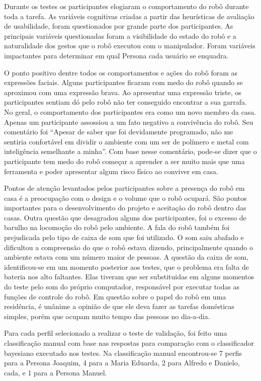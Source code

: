Durante os testes os participantes elogiaram o comportamento do robô durante toda a tarefa. As variáveis cognitivas criadas a partir das heurísticas de avaliação de usabilidade, foram questionados por grande parte dos participantes. As principais variáveis questionadas foram a visibilidade do estado do robô e a naturalidade dos gestos que o robô executou com o manipulador. Foram variáveis impactantes para determinar em qual Persona cada usuário se enquadra.

O ponto positivo dentre todos os comportamentos e ações do robô foram as expressões faciais. Alguns participantes ficaram com medo do robô quando se aproximou com uma expressão brava. Ao apresentar uma expressão triste, os participantes sentiam dó pelo robô não ter conseguido encontrar a sua garrafa. No geral, o comportamento dos participantes era como um novo membro da casa. Apenas um participante assossiou a um fato negativo a convivência do robô. Seu comentário foi ``Apesar de saber que foi devidamente programado, não me sentiria confortável em dividir o ambiente com um ser de polímero e metal com inteligência semelhante a minha''. Com base nesse comentário, pode-se dizer que o participante tem medo do robô começar a aprender a ser muito  mais que uma ferramenta e poder apresentar algum risco físico ao conviver em casa.

Pontos de atenção levantados pelos participantes sobre a presença do robô em casa é a preocupação com o design e o volume que o robô ocupará. São pontos importantes para o desenvolvimento do projeto e aceitação do robô dentro das casas. Outra questão que desagradou alguns dos participantes, foi o excesso de barulho na locomoção do robô pelo ambiente. A fala do robô também foi prejudicada pelo tipo de caixa de som que foi utilizado. O som saiu abafado e dificultou a compreensão do que o robô estava dizendo, principalmente quando o ambiente estava com um número maior de pessoas. A questão da caixa de som, identificou-se em um momento posterior aos testes, que o problema era falta de bateria nos alto faltantes. Elas tiveram que ser substituidas em alguns momentos do teste pelo som do próprio computador, responsável por executar todas as funções de controle do robô. Em questão sobre o papel do robô em uma residência, é unânime a opinião de que ele deva fazer as tarefas domésticas simples, porém que ocupam muito tempo das pessoas no dia-a-dia.

Para cada perfil selecionado a realizar o teste de validação, foi feito uma classificação manual com base nas respostas para comparação com o classificador bayesiano executado nos testes. Na classificação manual encontrou-se 7 perfis para a Persona Joaquim, 4 para a Maria Eduarda, 2 para Alfredo e Danielo, cada, e 1 para a Persona Manuel.

